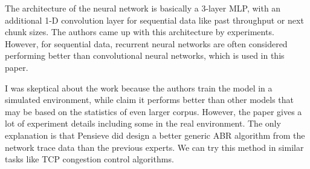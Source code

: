\documentclass{manuscript}
\begin{document}
    The architecture of the neural network is basically a 3-layer MLP, with an additional 1-D convolution layer for
    sequential data like past throughput or next chunk sizes. The authors came up with this architecture by experiments.
    However, for sequential data, recurrent neural networks are often considered performing better than convolutional
    neural networks\cite{lecun_deep_2015}, which is used in this paper.

    I was skeptical about the work because the authors train the model in a simulated environment, while claim it performs
    better than other models that may be based on the statistics of even larger corpus. However, the paper gives a lot
    of experiment details including some in the real environment. The only explanation is that Pensieve did design a
    better generic ABR algorithm from the network trace data than the previous experts. We can try this method in similar
    tasks like TCP congestion control algorithms.

    
    
\end{document}
